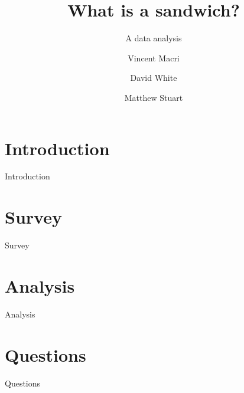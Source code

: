 

\title{What is a sandwich?}
\subtitle{A data analysis}
\author{Vincent Macri \and David White \and Matthew Stuart}


	\maketitle
	
	\tableofcontents
	\clearpage
	\part{Introduction}\label{part:introduction}
		{Introduction}
	\part{Survey}\label{part:survey}
		{Survey}
	\part{Analysis}\label{part:analysis}
		{Analysis}
	\appendix
	\part{Questions}\label{part:appendix}
		{Questions}
	\nocite{*}
	\printbibliography

